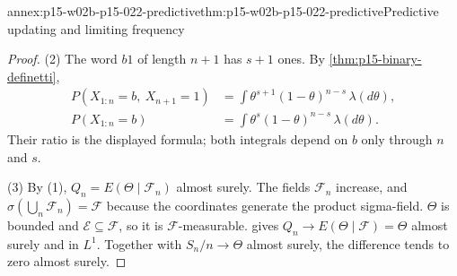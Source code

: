 \begin{annexitem}{annex:p15-w02b-p15-022-predictive}{thm:p15-w02b-p15-022-predictive}{Predictive updating and limiting frequency}
\begin{proof}
(2) The word \(b1\) of length \(n+1\) has \(s+1\) ones. By
\cref{thm:p15-binary-definetti},
\[
 \begin{aligned}
 P(X_{1:n}=b,\ X_{n+1}=1)&=\int\theta^{s+1}(1-\theta)^{n-s}\,\lambda(d\theta),\\
 P(X_{1:n}=b)&=\int\theta^{s}(1-\theta)^{n-s}\,\lambda(d\theta).
 \end{aligned}
\]
Their ratio is the displayed formula; both integrals depend on \(b\) only
through \(n\) and \(s\).

(3) By (1), \(Q_n=E(\Theta\mid\mathcal F_n)\) almost surely. The fields
\(\mathcal F_n\) increase, and \(\sigma(\bigcup_n\mathcal F_n)=\mathcal F\)
because the coordinates generate the product sigma-field. \(\Theta\) is
bounded and \(\mathcal E\subseteq\mathcal F\), so it is
\(\mathcal F\)-measurable.  gives
\(Q_n\to E(\Theta\mid\mathcal F)=\Theta\) almost surely and in \(L^1\).
Together with \(S_n/n\to\Theta\) almost surely, the difference tends to
zero almost surely.
\end{proof}
\end{annexitem}

